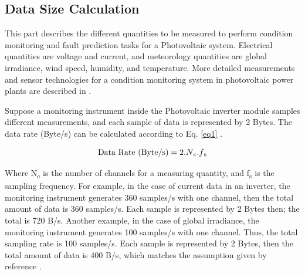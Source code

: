 \documentclass[conference, letterpaper]{IEEEtran}
\begin{document}
\subsection{Data Size Calculation}\label{AA}

This part describes the different quantities to be measured to perform condition monitoring and fault prediction tasks for a Photovoltaic system. Electrical quantities are voltage and current, and meteorology quantities are global irradiance, wind speed, humidity, and temperature. More detailed measurements and sensor technologies for a condition monitoring system in photovoltaic power plants are described in \cite{b8}.

Suppose a monitoring instrument inside the Photovoltaic inverter module samples different measurements, and each sample of data is represented by 2 Bytes. The data rate (Byte/s) can be calculated according to Eq. \eqref{eq1} \cite{b7}.

\begin{equation}
\text{Data Rate (Byte/s)} = 2.N\textsubscript{c}.f\textsubscript{s}\label{eq1}
\end{equation}

Where N\textsubscript{c} is the number of channels for a measuring quantity, and f\textsubscript{s} is the sampling frequency. For example, in the case of current data in an inverter, the monitoring instrument generates 360 samples/s with one channel, then the total amount of data is 360 samples/s. Each sample is represented by 2 Bytes then; the total is 720 B/s. Another example, in the case of global irradiance, the monitoring instrument generates 100 samples/s with one channel. Thus, the total sampling rate is 100 samples/s. Each sample is represented by 2 Bytes, then the total amount of data is 400 B/s, which matches the assumption given by reference \cite{b8}.
\end{document}
